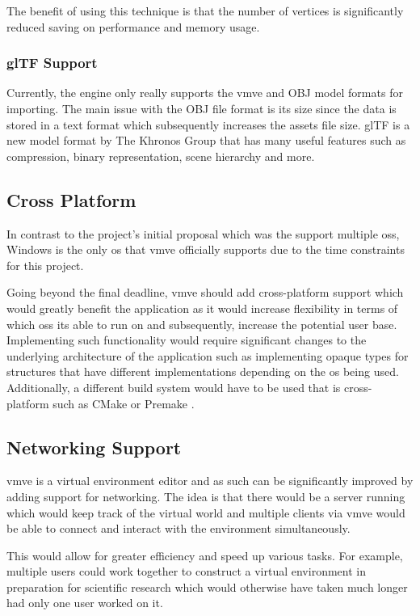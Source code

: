 \documentclass[11pt]{article}
\begin{document}
The benefit of using this technique is that the number of vertices is
significantly reduced saving on performance and memory usage.


\subsubsection{glTF Support}
Currently, the engine only really supports the \gls*{vmve} and OBJ model formats for
importing. The main issue with the OBJ file format is its size since the data is
stored in a text format which subsequently increases the assets file size. glTF
\cite{gltf} is a new model format by The Khronos Group that has many useful
features such as compression, binary representation, scene hierarchy and more.

\subsection{Cross Platform}
In contrast to the project's initial proposal which was the support multiple
\glspl*{os}, Windows is the only \gls*{os} that \gls*{vmve} officially supports due
to the time constraints for this project. 

Going beyond the final deadline, \gls*{vmve} should add cross-platform support
which would greatly benefit the application as it would increase flexibility in
terms of which \glspl*{os} its able to run on and subsequently, increase the
potential user base. Implementing such functionality would require significant
changes to the underlying architecture of the application such as implementing
opaque types for structures that have different implementations depending on the
\gls*{os} being used. Additionally, a different build system would have to be
used that is cross-platform such as CMake \cite{cmake} or Premake \cite{premake}.

\subsection{Networking Support}
\gls*{vmve} is a virtual environment editor and as such can be significantly
improved by adding support for networking. The idea is that there would be a
server running which would keep track of the virtual world and multiple clients
via \gls*{vmve} would be able to connect and interact with the environment
simultaneously.

This would allow for greater efficiency and speed up various tasks. For example,
multiple users could work together to construct a virtual environment in
preparation for scientific research which would otherwise have taken much longer
had only one user worked on it.
\end{document}
